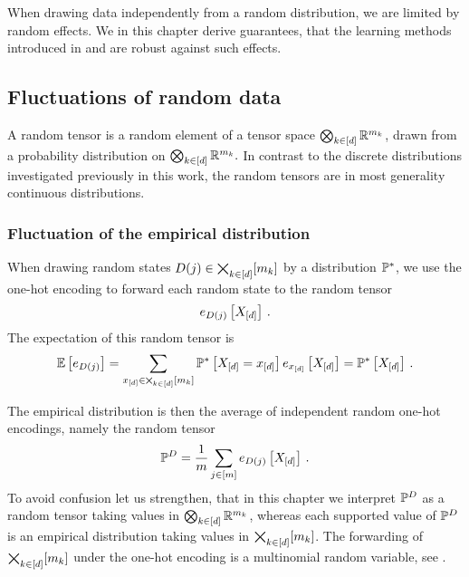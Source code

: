 \section{\chatextconcentration}\label{cha:concentration}

When drawing data independently from a random distribution, we are limited by random effects.
We in this chapter derive guarantees, that the learning methods introduced in  and  are robust against such effects.

\subsection{Fluctuations of random data}

A random tensor is a random element of a tensor space $\bigotimes_{k\in[d]} \mathbb{R}^{m_{k}}$, drawn from a probability distribution on $\bigotimes_{k\in[d]} \mathbb{R}^{m_{k}}.$
In contrast to the discrete distributions investigated previously in this work, the random tensors are in most generality continuous distributions. %

\subsubsection{Fluctuation of the empirical distribution}

When drawing random states $D(j)\in\bigtimes_{k\in[d]}[m_{k}]$ by a distribution $\mathbb{P}^*$, we use the one-hot encoding to forward each random state to the random tensor
\[ e_{D(j)}\left[X_{[d]}\right] \, . \]
The expectation of this random tensor is
\begin{align*}
    \mathbb{E}\left[e_{D(j)}\right]
    = \sum_{x_{[d]}\in\bigtimes_{k\in[d]}[m_{k}]} \mathbb{P}^*\left[X_{[d]}=x_{[d]}\right] e_{x_{[d]}}\left[X_{[d]}\right]
    = \mathbb{P}^*\left[X_{[d]}\right] \, .
\end{align*}

The empirical distribution is then the average of independent random one-hot encodings, namely the random tensor
\[ \mathbb{P}^{D} = \frac{1}{m} \sum_{j\in[m]}  e_{D(j)}\left[X_{[d]}\right] \, . \]
To avoid confusion let us strengthen, that in this chapter we interpret $\mathbb{P}^{D}$ as a random tensor taking values in $\bigotimes_{k\in[d]} \mathbb{R}^{m_{k}}$, whereas each supported value of $\mathbb{P}^{D}$ is an empirical distribution taking values in $\bigtimes_{k\in[d]}[m_{k}]$.
The forwarding of $\bigtimes_{k\in[d]}[m_{k}]$ under the one-hot encoding is a multinomial random variable, see .


